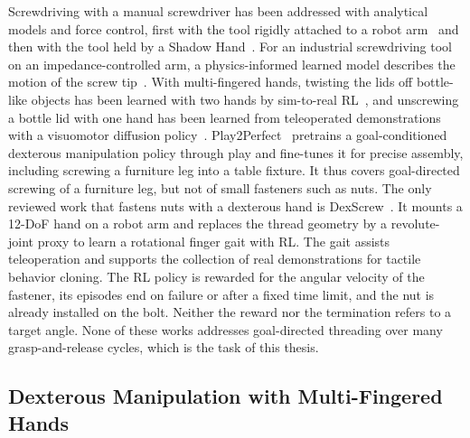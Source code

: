 Screwdriving with a manual screwdriver has been addressed with analytical models and force control, first with the tool rigidly attached to a robot arm~\cite{Tang2023} and then with the tool held by a Shadow Hand~\cite{Tang2024screwdriving}. For an industrial screwdriving tool on an impedance-controlled arm, a physics-informed learned model describes the motion of the screw tip~\cite{Manyar2023}. With multi-fingered hands, twisting the lids off bottle-like objects has been learned with two hands by sim-to-real \ac{RL}~\cite{Lin2024}, and unscrewing a bottle lid with one hand has been learned from teleoperated demonstrations with a visuomotor diffusion policy~\cite{Koczy2025}. Play2Perfect~\cite{Lum2026} pretrains a goal-conditioned dexterous manipulation policy through play and fine-tunes it for precise assembly, including screwing a furniture leg into a table fixture. It thus covers goal-directed screwing of a furniture leg, but not of small fasteners such as nuts. The only reviewed work that fastens nuts with a dexterous hand is DexScrew~\cite{Hsieh2026}. It mounts a 12-DoF hand on a robot arm and replaces the thread geometry by a revolute-joint proxy to learn a rotational finger gait with \ac{RL}. The gait assists teleoperation and supports the collection of real demonstrations for tactile behavior cloning. The \ac{RL} policy is rewarded for the angular velocity of the fastener, its episodes end on failure or after a fixed time limit, and the nut is already installed on the bolt. Neither the reward nor the termination refers to a target angle. None of these works addresses goal-directed threading over many grasp-and-release cycles, which is the task of this thesis.

\subsection{Dexterous Manipulation with Multi-Fingered Hands}\label{sec:related-dexterous}

